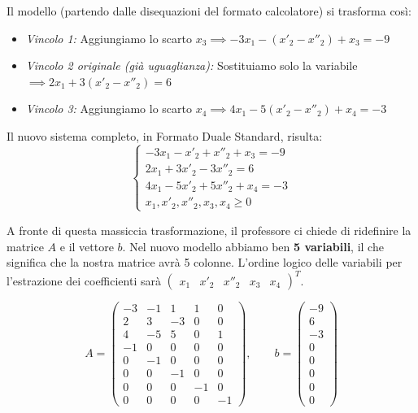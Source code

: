 \documentclass[12pt, a4paper]{article}
\begin{document}
	Il modello (partendo dalle disequazioni del formato calcolatore) si trasforma così:
	\begin{itemize}
		\item \textit{Vincolo 1:} Aggiungiamo lo scarto $x_3 \implies -3x_1 - (x'_2 - x''_2) + x_3 = -9$
		\item \textit{Vincolo 2 originale (già uguaglianza):} Sostituiamo solo la variabile $\implies 2x_1 + 3(x'_2 - x''_2) = 6$
		\item \textit{Vincolo 3:} Aggiungiamo lo scarto $x_4 \implies 4x_1 - 5(x'_2 - x''_2) + x_4 = -3$
	\end{itemize}
	
	Il nuovo sistema completo, in Formato Duale Standard, risulta:
	\[
	\begin{cases}
		-3x_1 - x'_2 + x''_2 + x_3 = -9 \\
		2x_1 + 3x'_2 - 3x''_2 = 6 \\
		4x_1 - 5x'_2 + 5x''_2 + x_4 = -3 \\
		x_1, x'_2, x''_2, x_3, x_4 \geq 0
	\end{cases}
	\]
	
	A fronte di questa massiccia trasformazione, il professore ci chiede di ridefinire la matrice $A$ e il vettore $b$. Nel nuovo modello abbiamo ben \textbf{5 variabili}, il che significa che la nostra matrice avrà 5 colonne. L'ordine logico delle variabili per l'estrazione dei coefficienti sarà $\begin{pmatrix} x_1 & x'_2 & x''_2 & x_3 & x_4 \end{pmatrix}^T$.
	
	\[
	A = \begin{pmatrix} 
		-3 & -1 & 1 & 1 & 0 \\ 
		2 & 3 & -3 & 0 & 0 \\ 
		4 & -5 & 5 & 0 & 1 \\
		-1 & 0 & 0 & 0 & 0 \\
		0 & -1 & 0 & 0 & 0 \\
		0 & 0 & -1 & 0 & 0 \\
		0 & 0 & 0 & -1 & 0 \\
		0 & 0 & 0 & 0 & -1
	\end{pmatrix}, \qquad 
	b = \begin{pmatrix} 
		-9 \\ 
		6 \\ 
		-3 \\
		0 \\
		0 \\
		0 \\
		0 \\
		0
	\end{pmatrix}
	\]
	
\end{document}
